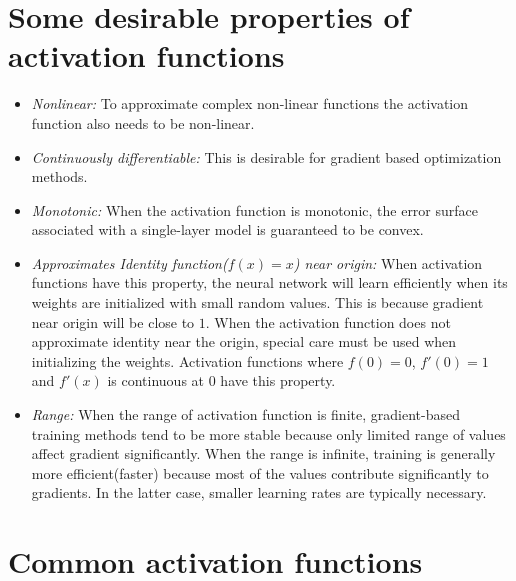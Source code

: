 \documentclass{article}
\begin{document}
\section*{Some desirable properties of activation functions}
\begin{itemize}
    \item \textit{Nonlinear:} To approximate complex non-linear functions the activation function also needs to be non-linear.
    \item \textit{Continuously differentiable:} This is desirable for gradient based optimization methods.
    \item \textit{Monotonic:} When the activation function is monotonic, the error surface associated with a single-layer model is guaranteed to be convex.
    \item \textit{Approximates Identity function($f(x)=x$) near origin:} When activation functions have this property, the neural network will learn efficiently when its weights are initialized with small random values. This is because gradient near origin will be close to $1$. When the activation function does not approximate identity near the origin, special care must be used when initializing the weights. Activation functions where $f(0)=0$, $f'(0)=1$ and $f'(x)$ is continuous at $0$ have this property.  
    \item \textit{Range:} When the range of activation function is finite, gradient-based training methods tend to be more stable because only limited range of values affect gradient significantly. When the range is infinite, training is generally more efficient(faster) because most of the values contribute significantly to gradients. In the latter case, smaller learning rates are typically necessary.  
    
\end{itemize}

\section*{Common activation functions}
\end{document}
